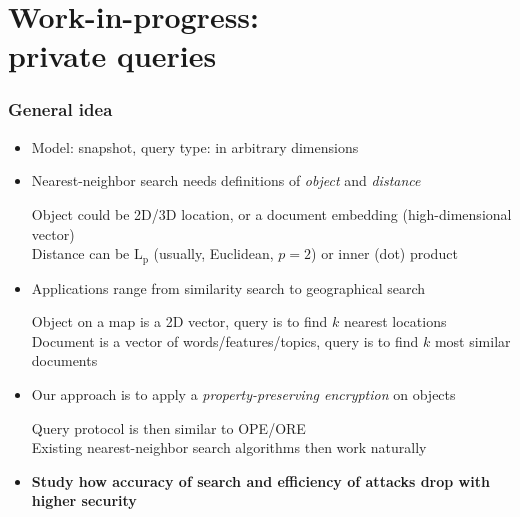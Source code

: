 \section{Work-in-progress: \\ private \knn{} queries}

	\begin{frame}[label={frame:knn}]

		\frametitle{General idea}

		\begin{itemize}
			\item<1->
				Model: \alert{snapshot}, query type: \alert{\knn{}} in arbitrary dimensions

			\item<2->
				Nearest-neighbor search needs definitions of \emph{object} and \emph{distance} \\
				\begin{small}
					\indent{} Object could be 2D/3D location, or a document embedding (high-dimensional vector) \\
					\indent{} Distance can be $\text{L}_\text{p}$ (usually, Euclidean, $p = 2$) or inner (dot) product
				\end{small}

			\item<3->
				Applications range from similarity search to geographical search \\
				\begin{small}
					\indent{} Object on a map is a 2D vector, query is to find $k$ nearest locations \\
					\indent{} Document is a vector of words/features/topics, query is to find $k$ most similar documents
				\end{small}

			\item<4->
				Our approach is to apply a \emph{property-preserving encryption} on objects \\
				\begin{small}
					\indent{} Query protocol is then similar to OPE/ORE \\
					\indent{} Existing nearest-neighbor search algorithms then work naturally
				\end{small}

			\item<5->
				\textbf{Study how accuracy of search and efficiency of attacks drop with higher security}

		\end{itemize}

	\end{frame}


